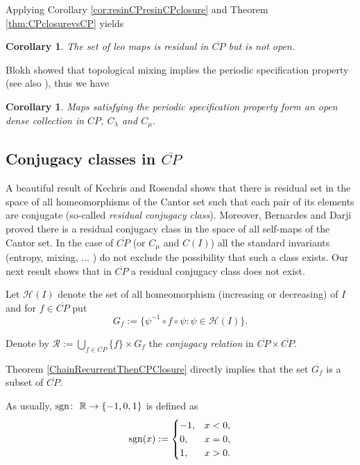 \documentclass[12pt, a4paper]{amsart}
\newtheorem{corollary}[theorem]{Corollary}
\def\sgn{\mbox{\rm sgn} }
\newcommand{\?}{{\bf ???}}
\def\CP{\overline{CP}}
\begin{document}
 Applying Corollary \ref{cor:resinCPresinCPclosure} and Theorem \ref{thm:CPclosurevsCP} yields

\begin{corollary}
The set of leo maps is residual in $\CP$  but is not open.
\end{corollary}




Blokh showed
that topological mixing implies the periodic specification property \cite[Theorem 3.4]{R} (see also \cite[Appendix A]{Buzzi}), thus we have

\begin{corollary}\label{cor:psp}
Maps satisfying the periodic specification property form an open dense collection in $CP$, $C_{\lambda}$ and $C_{\mu}$.
\end{corollary}

\subsection{Conjugacy classes in $\overline{CP}$}\label{subsec:conjugacyclasses} 

A beautiful result of Kechris and Rosendal \cite{KR} shows that there is residual set in the space of all homeomorphisms of the Cantor set such that each pair of its elements are conjugate (so-called \textit{residual conjugacy class}). Moreover, Bernardes and Darji \cite{BD} proved there is a residual conjugacy class in the space of all self-maps of the Cantor set. In the case of $\CP$ (or  $C_{\mu}$ and $C(I)$) all the standard invariants (entropy, mixing, ... ) do not exclude the possibility that such a class exists. 
Our next result shows that in $\CP$ a residual conjugacy class  does not exist.   

Let $\mathcal{H}(I)$ denote the set of all homeomorphism (increasing  or decreasing) of $I$ and for $f\in \CP$ put $$G_f :=\{\psi^{-1} \circ f \circ \psi: \psi\in\mathcal{H}(I)\}.$$

 Denote by $\mathcal{R}:=\bigcup_{f\in \CP}\{f\}\times G_{f}$ the {\em conjugacy relation} in $\CP\times \CP$.

Theorem \ref{ChainRecurrentThenCPClosure} directly implies that the set $\overline{G_f}$ is a subset of $\CP$. 

As usually, $\sgn\colon~\mathbb R\to\{-1,0,1\}$ is defined as 
$$
\sgn(x):=\begin{cases}
-1,& x<0,\\
0,& x=0,\\
1,& x>0.
\end{cases}
$$
\end{document}
